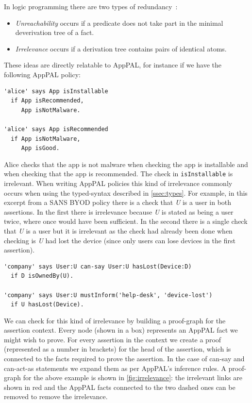 \documentclass[thesis.tex]{subfiles}
\begin{document}
In logic programming there are two types of redundancy~\cite{alon_levy_constraints_1992}:
\begin{itemize}
\item \emph{Unreachability} occurs if a predicate does not take part in the
  minimal deverivation tree of a fact.
\item \emph{Irrelevance} occurs if a derivation tree contains pairs of identical atoms.
\end{itemize}

These ideas are directly relatable to AppPAL, for instance if we have the
following AppPAL policy:

\begin{lstlisting}
'alice' says App isInstallable
  if App isRecommended,
     App isNotMalware.

'alice' says App isRecommended
  if App isNotMalware,
     App isGood.
\end{lstlisting}

Alice checks that the app is not malware when checking the app is
installable and when checking that the app is recommended.  The check in
\texttt{isInstallable} is irrelevant.  When writing AppPAL policies this kind of
irrelevance commonly occurs when using the typed-syntax described in
\autoref{ssec:types}. For example, in this excerpt from a SANS BYOD policy there
is a check that \emph{U} is a user in both assertions.  In the first there is
irrelevance because \emph{U} is stated as being a user twice, where once would
have been sufficient.  In the second there is a single check that \emph{U} is a
user but it is irrelevant as the check had already been done when checking is
\emph{U} had lost the device (since only users can lose devices in the first assertion).

\begin{lstlisting}
'company' says User:U can-say User:U hasLost(Device:D)
  if D isOwnedBy(U).

'company' says User:U mustInform('help-desk', 'device-lost')
  if U hasLost(Device).
\end{lstlisting}

We can check for this kind of irrelevance by building a proof-graph for the
assertion context.  Every node (shown in a box) represents an AppPAL fact we
might wish to prove.  For every assertion in the context we create a proof
(represented as a number in brackets) for the head of the assertion, which is
connected to the facts required to prove the assertion.  In the case of can-say
and can-act-as statements we expand them as per AppPAL's inference rules.
A proof-graph for the above example is shown in \autoref{fig:irrelevance}: the
irrelevant links are shown in red and the AppPAL facts connected to the two
dashed ones can be removed to remove the irrelevance.
\end{document}
